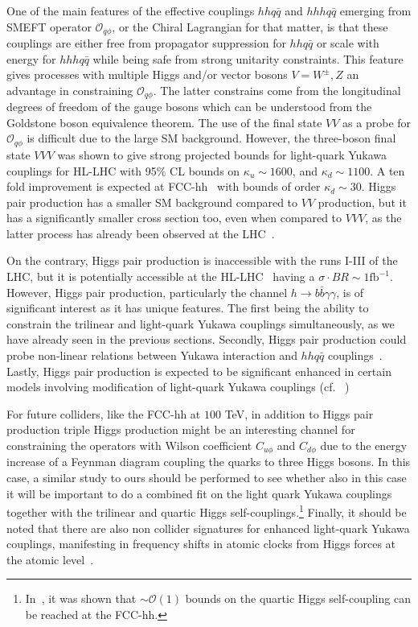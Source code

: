 One of the main features of the effective couplings $hh q\bar q$ and $hhh q\bar q$ emerging from SMEFT operator $\mathcal O_{q\phi}$, or the Chiral Lagrangian for that matter, is that these couplings are either free from propagator suppression for $hh q\bar q$ or scale with energy for $hhh q\bar q$ while being safe from strong unitarity constraints. This feature gives processes with multiple Higgs and/or vector bosons $V= W^\pm, Z$ an advantage in constraining $\mathcal O_{q\phi}$. The latter constrains come from the longitudinal degrees of freedom of the gauge bosons  which can be understood from the Goldstone boson equivalence theorem. The use of the final state $VV$ as a probe for $\mathcal O_{q\phi}$ is difficult due to the large SM background. However, the three-boson final state $VVV$ was shown to give strong projected bounds for light-quark Yukawa couplings for HL-LHC with 95\% CL bounds on $\kappa_u \sim 1600$, and $\kappa_d\sim 1100$. A ten fold improvement is expected at FCC-hh~\cite{Falkowski:2020znk} with bounds of order $\kappa_d\sim 30$. 
Higgs pair production has a smaller SM background compared to $VV$ production, but it has a significantly smaller cross section too, even when compared to $VVV$, as the latter process has already been observed at the LHC~\cite{Sciandra:2688061,CMS-PAS-SMP-19-014}.

On the contrary, Higgs pair production is inaccessible with the runs I-III of the LHC, but it is potentially accessible at the HL-LHC~\cite{Binoth:2006ym} having a $ \sigma \cdot BR\sim 1\mathrm{fb}^{-1}$. However, Higgs pair production, particularly the channel $h \to b \bar b \gamma \gamma $, is of significant interest as it has unique features. The first being the ability to constrain the trilinear and light-quark Yukawa couplings simultaneously, as we have already seen in the previous sections. Secondly, Higgs pair production could probe non-linear relations between Yukawa interaction and $hh q\bar q$ couplings~\cite{Contino:2012xk}. Lastly, Higgs pair production is expected to be significant enhanced in certain models involving modification of light-quark Yukawa couplings (cf. ~\cite{Bar-Shalom:2018rjs,Bauer:2017cov,Egana-Ugrinovic:2021uew})

For future colliders, like the FCC-hh at $100$ TeV, in addition to Higgs pair production triple Higgs production might be an interesting channel for constraining the operators with Wilson coefficient $C_{u\phi}$ and $C_{d\phi}$ due to the energy increase of a Feynman diagram coupling the quarks to three Higgs bosons.   In this case, a similar study to ours should be performed to see whether also in this case it will be important to do a combined fit on the light quark Yukawa couplings together with the trilinear and quartic Higgs self-couplings.\footnote{In~\cite{Papaefstathiou:2047255}, it was shown that $\sim \mathcal{O}(1)$ bounds on the quartic Higgs self-coupling can be reached at the FCC-hh.}
Finally, it should be noted that there are also non collider signatures for enhanced light-quark Yukawa couplings, manifesting in frequency shifts in atomic clocks from Higgs forces at the atomic level~\cite{Delaunay:2016brc}. 

